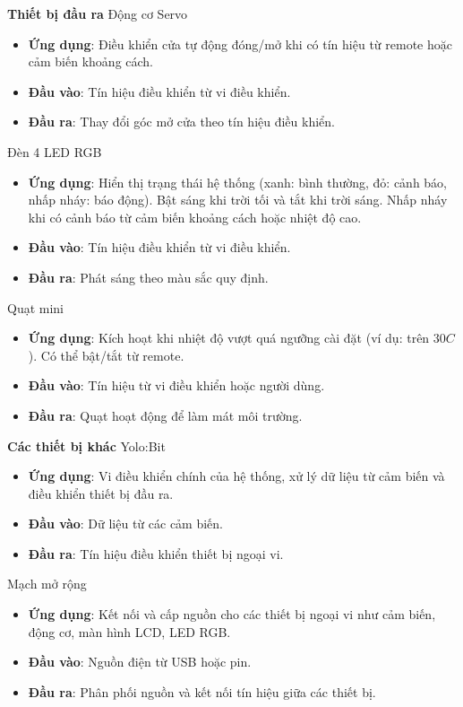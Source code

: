 \textbf{Thiết bị đầu ra}
Động cơ Servo
\begin{itemize}
    \item \textbf{Ứng dụng}: Điều khiển cửa tự động đóng/mở khi có tín hiệu từ remote hoặc cảm biến khoảng cách.
    \item \textbf{Đầu vào}: Tín hiệu điều khiển từ vi điều khiển.
    \item \textbf{Đầu ra}: Thay đổi góc mở cửa theo tín hiệu điều khiển.
\end{itemize}

Đèn 4 LED RGB
\begin{itemize}
    \item \textbf{Ứng dụng}: Hiển thị trạng thái hệ thống (xanh: bình thường, đỏ: cảnh báo, nhấp nháy: báo động). Bật sáng khi trời tối và tắt khi trời sáng. Nhấp nháy khi có cảnh báo từ cảm biến khoảng cách hoặc nhiệt độ cao.
    \item \textbf{Đầu vào}: Tín hiệu điều khiển từ vi điều khiển.
    \item \textbf{Đầu ra}: Phát sáng theo màu sắc quy định.
\end{itemize}


Quạt mini
\begin{itemize}
    \item \textbf{Ứng dụng}: Kích hoạt khi nhiệt độ vượt quá ngưỡng cài đặt (ví dụ: trên $30 C$). Có thể bật/tắt từ remote.
    \item \textbf{Đầu vào}: Tín hiệu từ vi điều khiển hoặc người dùng.
    \item \textbf{Đầu ra}: Quạt hoạt động để làm mát môi trường.
\end{itemize}

\textbf{Các thiết bị khác}
Yolo:Bit
\begin{itemize}
    \item \textbf{Ứng dụng}: Vi điều khiển chính của hệ thống, xử lý dữ liệu từ cảm biến và điều khiển thiết bị đầu ra.
    \item \textbf{Đầu vào}: Dữ liệu từ các cảm biến.
    \item \textbf{Đầu ra}: Tín hiệu điều khiển thiết bị ngoại vi.
\end{itemize}

Mạch mở rộng
\begin{itemize}
    \item \textbf{Ứng dụng}: Kết nối và cấp nguồn cho các thiết bị ngoại vi như cảm biến, động cơ, màn hình LCD, LED RGB.
    \item \textbf{Đầu vào}: Nguồn điện từ USB hoặc pin.
    \item \textbf{Đầu ra}: Phân phối nguồn và kết nối tín hiệu giữa các thiết bị.
\end{itemize}

